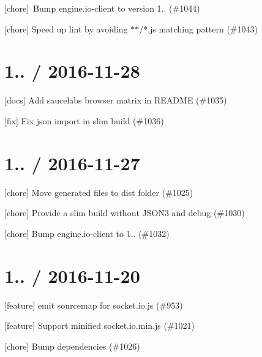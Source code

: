 
\begin{DoxyItemize}
\item \mbox{[}chore\mbox{]} \+Bump engine.\+io-\/client to version 1.. (\#1044)
\item \mbox{[}chore\mbox{]} Speed up lint by avoiding \textquotesingle{}$\ast$$\ast$/$\ast$.js\textquotesingle{} matching pattern (\#1043)
\end{DoxyItemize}

\section*{1.. / 2016-\/11-\/28 }


\begin{DoxyItemize}
\item \mbox{[}docs\mbox{]} Add saucelabs browser matrix in R\+E\+A\+D\+ME (\#1035)
\item \mbox{[}fix\mbox{]} Fix json import in slim build (\#1036)
\end{DoxyItemize}

\section*{1.. / 2016-\/11-\/27 }


\begin{DoxyItemize}
\item \mbox{[}chore\mbox{]} Move generated files to {\ttfamily dist} folder (\#1025)
\item \mbox{[}chore\mbox{]} Provide a slim build without J\+S\+O\+N3 and debug (\#1030)
\item \mbox{[}chore\mbox{]} Bump engine.\+io-\/client to 1.. (\#1032)
\end{DoxyItemize}

\section*{1.. / 2016-\/11-\/20 }


\begin{DoxyItemize}
\item \mbox{[}feature\mbox{]} emit sourcemap for socket.\+io.\+js (\#953)
\item \mbox{[}feature\mbox{]} Support minified {\ttfamily socket.\+io.\+min.\+js} (\#1021)
\item \mbox{[}chore\mbox{]} Bump dependencies (\#1026)
\end{DoxyItemize}

